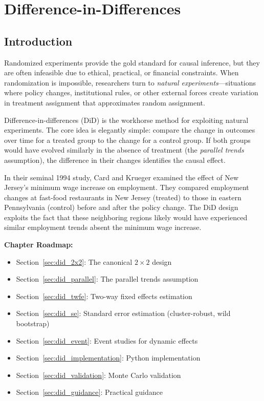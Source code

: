 
\chapter{Difference-in-Differences}
\label{ch:did_classic}

\section{Introduction}
\label{sec:did_intro}

Randomized experiments provide the gold standard for causal inference, but they are often infeasible due to ethical, practical, or financial constraints. When randomization is impossible, researchers turn to \emph{natural experiments}---situations where policy changes, institutional rules, or other external forces create variation in treatment assignment that approximates random assignment.

Difference-in-differences (DiD) is the workhorse method for exploiting natural experiments. The core idea is elegantly simple: compare the change in outcomes over time for a treated group to the change for a control group. If both groups would have evolved similarly in the absence of treatment (the \emph{parallel trends} assumption), the difference in their changes identifies the causal effect.

\begin{example}
In their seminal 1994 study, Card and Krueger examined the effect of New Jersey's minimum wage increase on employment. They compared employment changes at fast-food restaurants in New Jersey (treated) to those in eastern Pennsylvania (control) before and after the policy change. The DiD design exploits the fact that these neighboring regions likely would have experienced similar employment trends absent the minimum wage increase.
\end{example}

\textbf{Chapter Roadmap:}
\begin{itemize}
    \item Section~\ref{sec:did_2x2}: The canonical $2 \times 2$ design
    \item Section~\ref{sec:did_parallel}: The parallel trends assumption
    \item Section~\ref{sec:did_twfe}: Two-way fixed effects estimation
    \item Section~\ref{sec:did_se}: Standard error estimation (cluster-robust, wild bootstrap)
    \item Section~\ref{sec:did_event}: Event studies for dynamic effects
    \item Section~\ref{sec:did_implementation}: Python implementation
    \item Section~\ref{sec:did_validation}: Monte Carlo validation
    \item Section~\ref{sec:did_guidance}: Practical guidance
\end{itemize}

